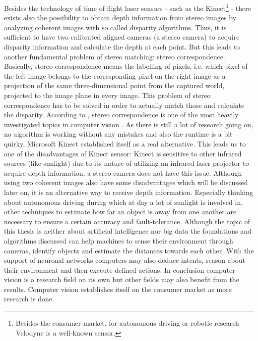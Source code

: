 \noindent Besides the technology of time of flight laser sensors - such as the Kinect\footnote{Besides the consumer market, for autonomous driving or robotic research Velodyne is a well-known sensor.} - there exists also the possibility to obtain depth information from stereo images by analyzing coherent images with so called disparity algorithms.
Thus, it is sufficient to have two calibrated aligned cameras (a stereo camera) to acquire disparity information and calculate the depth at each point.
But this leads to another fundamental problem of stereo matching: stereo correspondence.
Basically, stereo correspondence means the labelling of pixels, i.e. which pixel of the left image belongs to the corresponding pixel on the right image as a projection of the same three-dimensional point from the captured world, projected to the image plane in every image.
This problem of stereo correspondence has to be solved in order to actually match those and calculate the disparity.
According to \citeauthor{scharstein2002taxonomy}, stereo correspondence is one of the most heavily investigated topics in computer vision \citep{scharstein2002taxonomy}.
As there is still a lot of research going on, no algorithm is working without any mistakes and also the runtime is a bit quirky, Microsoft Kinect established itself as a real alternative.
This leads us to one of the disadvantages of Kinect sensor: Kinect is sensitive to other infrared sources (like sunlight) due to its nature of utilizing an infrared laser projector to acquire depth information, a stereo camera does not have this issue.
Although using two coherent images also have some disadvantages which will be discussed later on, it is an alternative way to receive depth information.
Especially thinking about autonomous driving during which at day a lot of sunlight is involved in, other techniques to estimate how far an object is away from one another are necessary to ensure a certain accuracy and fault-tolerance.
\newline\newline\noindent Although the topic of this thesis is neither about artificial intelligence nor big data the foundations and algorithms discussed can help machines to sense their environment through cameras, identify objects and estimate the distances towards each other.
With the support of neuronal networks computers may also deduce intents, reason about their environment and then execute defined actions.
In conclusion computer vision is a research field on its own but other fields may also benefit from the results.
Computer vision establishes itself on the consumer market as more research is done.
